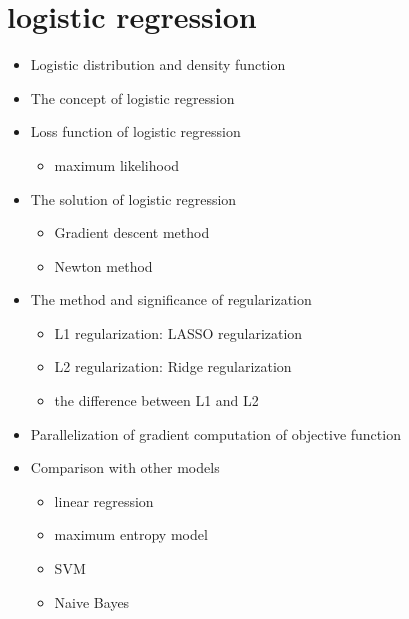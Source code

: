 \documentclass{amsart}
\begin{document}
\section{logistic regression}
    \begin{itemize}
        \item Logistic distribution and density function
        \item The concept of logistic regression
        \item Loss function of logistic regression
            \begin{itemize}
                \item maximum likelihood
            \end{itemize}
        \item The solution of logistic regression
            \begin{itemize}
                \item Gradient descent method
                \item Newton method
            \end{itemize}   
        \item The method and significance of regularization
            \begin{itemize}
                \item L1 regularization: LASSO regularization
                \item L2 regularization: Ridge regularization
                \item the difference between L1 and L2
            \end{itemize}
        \item Parallelization of gradient computation of objective function
        \item Comparison with other models
            \begin{itemize}
                \item linear regression
                \item maximum entropy model
                \item SVM
                \item Naive Bayes
            \end{itemize}
    \end{itemize}
\end{document}
